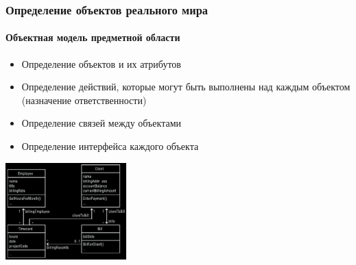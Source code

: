 \documentclass{../cscslides}
\begin{document}
    \begin{frame}
        \frametitle{Определение объектов реального мира}
        \framesubtitle{Объектная модель предметной области}
        \begin{itemize}
            \item Определение объектов и их атрибутов
            \item Определение действий, которые могут быть выполнены над каждым объектом (назначение ответственности)
            \item Определение связей между объектами
            \item Определение интерфейса каждого объекта
        \end{itemize}
        \begin{center}
            \includegraphics[width=0.35\textwidth]{billDomainModelBlack.png}
        \end{center}
    \end{frame}
\end{document}
